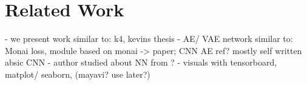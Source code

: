 
\chapter{Related Work}\label{chapter:related_work}

- we present work similar to: k4, kevins thesis \newline
- AE/ VAE network similar to: Monai loss, module based on monai -> paper; CNN AE ref? mostly self written absic CNN \newline
- author studied about NN from \parencite{Goodfellow-et-al-2016}? \newline
- visuals with tensorboard, matplot/ seaborn, (mayavi? use later?) \newline








